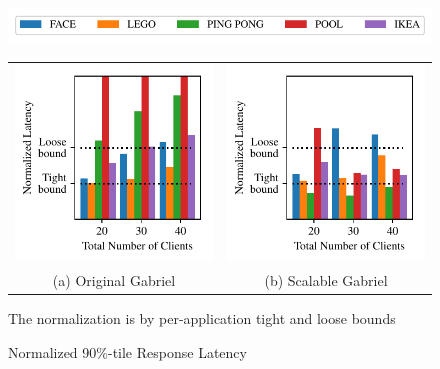 \begin{figure}
	\begin{center}
		\includegraphics[width=\linewidth]{FIGS/fig-alloc-latency-legend.pdf}
								
		\begin{tabular}{c@{}c}
			\includegraphics[width=.5\linewidth]{FIGS/fig-eval-latency-baseline.pdf}
			            & \includegraphics[width=.5\linewidth]{FIGS/fig-eval-latency-cpushares.pdf} \\
			{\small (a) Original  Gabriel} & {\small (b) Scalable Gabriel}                                                    
		\end{tabular}
	\end{center}

\begin{captiontext}
The normalization is by per-application tight and loose bounds~\cite{chen2017empirical}
\end{captiontext}
\vspace{-0.1in}
	\caption{\small Normalized 90\%-tile Response Latency}
	\label{fig:frame-latency}
\end{figure}

